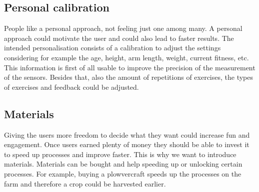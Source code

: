 \subsection{Personal calibration}
People like a personal approach, not feeling just one among many. A personal approach could motivate the user and could also lead to faster results. The intended personalisation consists of a calibration to adjust the settings considering for example the age, height, arm length, weight, current fitness, etc. This information is first of all usable to improve the precision of the measurement of the sensors. Besides that, also the amount of repetitions of exercises, the types of exercises and feedback could be adjusted.

\subsection{Materials}
Giving the users more freedom to decide what they want could increase fun and engagement. Once users earned plenty of money they should be able to invest it to speed up processes and improve faster. This is why we want to introduce materials. Materials can be bought and help speeding up or unlocking certain processes. For example, buying a plowvercraft speeds up the processes on the farm and therefore a crop could be harvested earlier. 